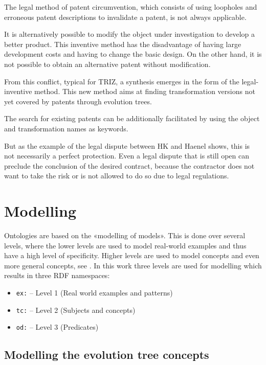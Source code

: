 \documentclass[11pt,a4paper]{article}
\begin{document}
The legal method of patent circumvention, which consists of using loopholes
and erroneous patent descriptions to invalidate a patent, is not always
applicable.

It is alternatively possible to modify the object under investigation to
develop a better product. This inventive method has the disadvantage of having
large development costs and having to change the basic design. On the other
hand, it is not possible to obtain an alternative patent without modification.

From this conflict, typical for TRIZ, a synthesis emerges in the form of the
legal-inventive method. This new method aims at finding transformation
versions not yet covered by patents through evolution trees.

The search for existing patents can be additionally facilitated by using the
object and transformation names as keywords.  

But as the example of the legal dispute between HK and Haenel shows, this is
not necessarily a perfect protection. Even a legal dispute that is still open
can preclude the conclusion of the desired contract, because the contractor
does not want to take the risk or is not allowed to do so due to legal
regulations.

\section{Modelling}

Ontologies are based on the «modelling of models». This is done over several
levels, where the lower levels are used to model real-world examples and thus
have a high level of specificity. Higher levels are used to model concepts and
even more general concepts, see \cite{Graebe2021}. In this work three levels
are used for modelling which results in three RDF namespaces:

\begin{itemize}[noitemsep]
\item \texttt{ex:} -- Level 1 (Real world examples and patterns)
\item \texttt{tc:} -- Level 2 (Subjects and concepts)
\item \texttt{od:} -- Level 3 (Predicates) 
\end{itemize}

\subsection{Modelling the evolution tree concepts}
\end{document}
